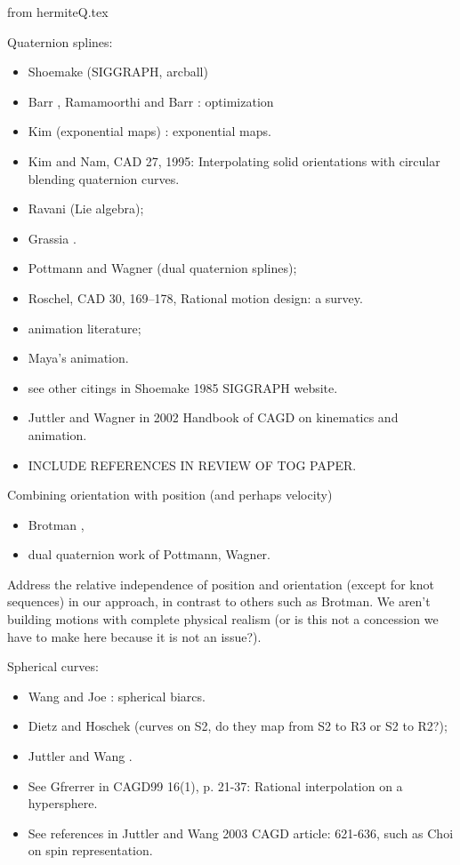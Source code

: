 \documentclass[12pt]{article}
\begin{document}
from hermiteQ.tex

Quaternion splines:
\begin{itemize}
\item Shoemake \cite{shoemake85} (SIGGRAPH, arcball)
\item Barr \cite{barr92}, Ramamoorthi and Barr \cite{rama97}: optimization
\item Kim (exponential maps) \cite{kim95}: exponential maps.
\item Kim and Nam, CAD 27, 1995: Interpolating solid orientations with circular
  blending quaternion curves.
\item Ravani (Lie algebra);
\item Grassia \cite{grassia98}.
\item Pottmann and Wagner (dual quaternion splines);
\item Roschel, CAD 30, 169--178, Rational motion design: a survey.
\item animation literature;  
\item Maya's animation.
\item see other citings in Shoemake 1985 SIGGRAPH website.
\item Juttler and Wagner in 2002 Handbook of CAGD on kinematics and animation.
\item INCLUDE REFERENCES IN REVIEW OF TOG PAPER.
\end{itemize}

Combining orientation with position (and perhaps velocity)
\begin{itemize}
\item Brotman \cite{brotman88},
\item dual quaternion work of Pottmann, Wagner.
\end{itemize}

Address the relative independence of position and orientation (except for knot
sequences) in our approach, in contrast to others such as Brotman.
We aren't building motions with complete physical realism (or is this not 
a concession we have to make here because it is not an issue?).

Spherical curves:
\begin{itemize}
\item Wang and Joe \cite{wang93}: spherical biarcs.
\item Dietz and Hoschek \cite{dietz93} (curves on S2, do they map from S2 to R3 or S2 to R2?);
\item Juttler and Wang \cite{jw03}.
\item See Gfrerrer in CAGD99 16(1), p. 21-37: Rational interpolation on a hypersphere.
\item See references in Juttler and Wang 2003 CAGD article: 621-636, such as 
  Choi on spin representation.
\end{itemize}
\end{document}
